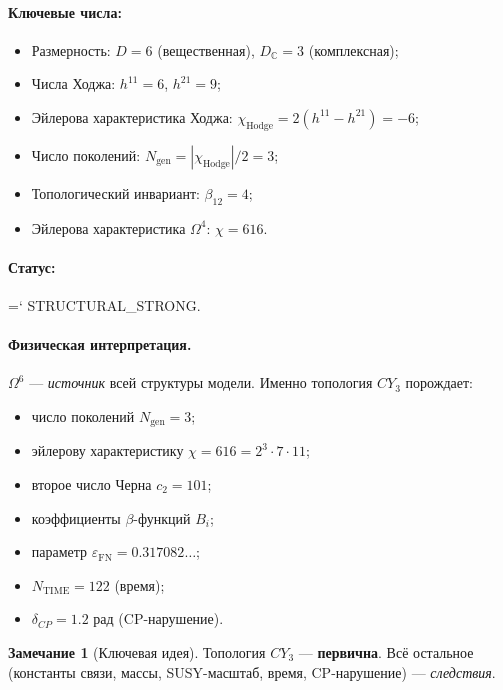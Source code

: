 \documentclass[11pt,a4paper]{article}
\newcommand{\CY}{CY_3}
\newcommand{\Om}{\Omega^4}
\newcommand{\Oms}{\Omega^6}
\newcommand{\Ngen}{N_{\text{gen}}}
\newcommand{\epsFN}{\varepsilon_{\text{FN}}}
\newcommand{\cTwo}{c_2}
\renewcommand{\texttt}[1]{{\ttfamily\hyphenchar\font=`\- #1}}
\theoremstyle{definition}
\newtheorem{remark}[theorem]{Замечание}
\begin{document}
\paragraph{Ключевые числа:}
\begin{itemize}
    \item Размерность: $D = 6$ (вещественная), 
          $D_{\mathbb{C}} = 3$ (комплексная);
    \item Числа Ходжа: $h^{11} = 6$, $h^{21} = 9$;
    \item Эйлерова характеристика Ходжа: 
          $\chi_{\text{Hodge}} = 2(h^{11} - h^{21}) = -6$;
    \item Число поколений: $\Ngen = |\chi_{\text{Hodge}}|/2 = 3$;
    \item Топологический инвариант: $\beta_{12} = 4$;
    \item Эйлерова характеристика $\Om$: $\chi = 616$.
\end{itemize}

\paragraph{Статус:} \texttt{STRUCTURAL\_STRONG}.

\paragraph{Физическая интерпретация.}
$\Oms$ — \emph{источник} всей структуры модели. Именно 
топология $\CY$ порождает:
\begin{itemize}
    \item число поколений $\Ngen = 3$;
    \item эйлерову характеристику $\chi = 616 = 2^3 \cdot 7 \cdot 11$;
    \item второе число Черна $\cTwo = 101$;
    \item коэффициенты $\beta$-функций $B_i$;
    \item параметр $\epsFN = 0.317082\ldots$;
    \item $N_{\text{TIME}} = 122$ (время);
    \item $\delta_{CP} = 1.2$ рад (CP-нарушение).
\end{itemize}

\begin{remark}[Ключевая идея]
\label{rem:cy-source}
Топология $\CY$ --- \textbf{первична}. Всё остальное 
(константы связи, массы, SUSY-масштаб, время, CP-нарушение) 
— \emph{следствия}.
\end{remark}
\end{document}
